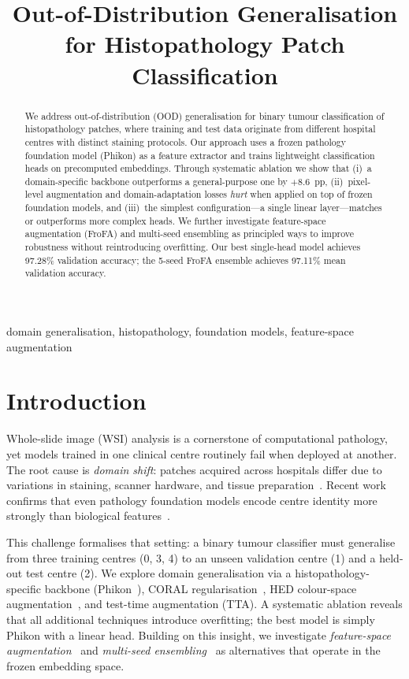 \documentclass{midl}
\title[OOD Generalisation for Histopathology]{Out-of-Distribution Generalisation for Histopathology Patch Classification}
\begin{document}
\maketitle

\begin{abstract}
We address out-of-distribution (OOD) generalisation for binary tumour classification of histopathology patches, where training and test data originate from different hospital centres with distinct staining protocols.
Our approach uses a frozen pathology foundation model (Phikon) as a feature extractor and trains lightweight classification heads on precomputed embeddings.
Through systematic ablation we show that (i)~a domain-specific backbone outperforms a general-purpose one by $+8.6$~pp, (ii)~pixel-level augmentation and domain-adaptation losses \emph{hurt} when applied on top of frozen foundation models, and (iii)~the simplest configuration---a single linear layer---matches or outperforms more complex heads.
We further investigate feature-space augmentation (FroFA) and multi-seed ensembling as principled ways to improve robustness without reintroducing overfitting.
Our best single-head model achieves 97.28\% validation accuracy; the 5-seed FroFA ensemble achieves 97.11\% mean validation accuracy.
\end{abstract}

\begin{keywords}
domain generalisation, histopathology, foundation models, feature-space augmentation
\end{keywords}

\section{Introduction}
\label{sec:intro}

Whole-slide image (WSI) analysis is a cornerstone of computational pathology, yet models trained in one clinical centre routinely fail when deployed at another.
The root cause is \emph{domain shift}: patches acquired across hospitals differ due to variations in staining, scanner hardware, and tissue preparation~\citep{tellez2019quantifying}.
Recent work confirms that even pathology foundation models encode centre identity more strongly than biological features~\citep{dejong2025unrobust}.

This challenge formalises that setting: a binary tumour classifier must generalise from three training centres (0, 3, 4) to an unseen validation centre (1) and a held-out test centre (2).
We explore domain generalisation via a histopathology-specific backbone (Phikon~\citep{filiot2023phikon}), CORAL regularisation~\citep{sun2016deep}, HED colour-space augmentation~\citep{tellez2019quantifying}, and test-time augmentation (TTA).
A systematic ablation reveals that all additional techniques introduce overfitting; the best model is simply Phikon with a linear head.
Building on this insight, we investigate \emph{feature-space augmentation}~\citep{bar2024frofa} and \emph{multi-seed ensembling}~\citep{wortsman2022model} as alternatives that operate in the frozen embedding space.
\end{document}
